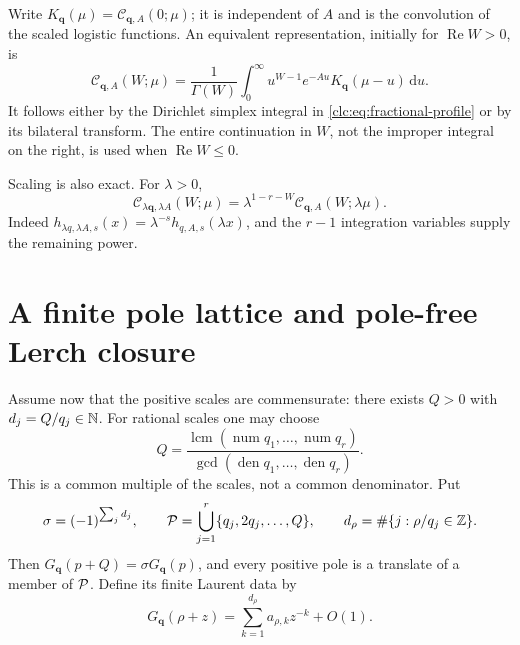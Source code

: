 \documentclass[11pt,a4paper]{article}
\numberwithin{equation}{section}
\theoremstyle{definition}\newtheorem{definition}[theorem]{Definition}
\theoremstyle{remark}\newtheorem{remark}[theorem]{Remark}
\DeclareMathOperator{\Rea}{Re}
\newcommand{\dd}{\,\mathrm d}
\newcommand{\bq}{\boldsymbol q}\newcommand{\bs}{\boldsymbol s}
\newcommand{\CC}{\mathcal C}\newcommand{\UU}{\mathcal U}\newcommand{\EE}{\mathcal E}
\begin{document}
Write $K_{\bq}(\mu)=\CC_{\bq,A}(0;\mu)$; it is independent of $A$ and
is the convolution of the scaled logistic functions. An equivalent
representation, initially for $\Rea W>0$, is
\begin{equation}\label{clc:eq:base-fractional}
 \CC_{\bq,A}(W;\mu)=\frac1{\Gamma(W)}
 \int_0^\infty u^{W-1}e^{-Au}K_{\bq}(\mu-u)\dd u.
\end{equation}
It follows either by the Dirichlet simplex integral in
\eqref{clc:eq:fractional-profile} or by its bilateral transform. The
entire continuation in $W$, not the improper integral on the right,
is used when $\Rea W\le0$.

Scaling is also exact. For $\lambda>0$,
\begin{equation}\label{clc:eq:scaling}
 \CC_{\lambda\bq,\lambda A}(W;\mu)
 =\lambda^{1-r-W}\CC_{\bq,A}(W;\lambda\mu).
\end{equation}
Indeed $h_{\lambda q,\lambda A,s}(x)=\lambda^{-s}h_{q,A,s}(\lambda x)$,
and the $r-1$ integration variables supply the remaining power.

\section{A finite pole lattice and pole-free Lerch closure}
\label{clc:sec:lattice}

Assume now that the positive scales are commensurate: there exists $Q>0$
with $d_j=Q/q_j\in\mathbb N$. For rational scales one may choose
\begin{equation}\label{clc:eq:Q}
 Q=\frac{\operatorname{lcm}(\operatorname{num}q_1,\ldots,
                              \operatorname{num}q_r)}
         {\gcd(\operatorname{den}q_1,\ldots,
                              \operatorname{den}q_r)}.
\end{equation}
This is a common multiple of the scales, not a common denominator.
Put
\begin{equation}\label{clc:eq:period-data}
 \sigma=(-1)^{\sum_jd_j},\qquad
 \mathcal P=\bigcup_{j=1}^r\{q_j,2q_j,\ldots,Q\},\qquad
 d_\rho=\#\{j:\rho/q_j\in\mathbb Z\}.
\end{equation}
Then $G_{\bq}(p+Q)=\sigma G_{\bq}(p)$, and every positive pole is a
translate of a member of $\mathcal P$. Define its finite Laurent data by
\begin{equation}\label{clc:eq:Laurent}
 G_{\bq}(\rho+z)=\sum_{k=1}^{d_\rho}a_{\rho,k}z^{-k}+O(1).
\end{equation}
\end{document}
